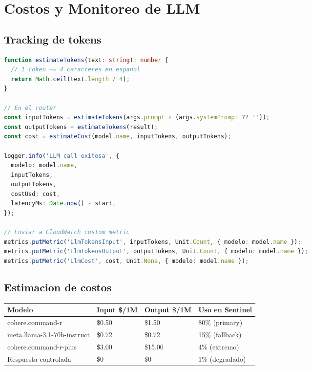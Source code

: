 \documentclass[11pt,a4paper]{article}
\begin{document}
\section{Costos y Monitoreo de LLM}

\subsection{Tracking de tokens}

\begin{lstlisting}[language=TypeScript, caption={Estimar tokens consumidos}]
function estimateTokens(text: string): number {
  // 1 token ~= 4 caracteres en espanol
  return Math.ceil(text.length / 4);
}

// En el router
const inputTokens = estimateTokens(args.prompt + (args.systemPrompt ?? ''));
const outputTokens = estimateTokens(result);
const cost = estimateCost(model.name, inputTokens, outputTokens);

logger.info('LLM call exitosa', {
  modelo: model.name,
  inputTokens,
  outputTokens,
  costUsd: cost,
  latencyMs: Date.now() - start,
});

// Enviar a CloudWatch custom metric
metrics.putMetric('LlmTokensInput', inputTokens, Unit.Count, { modelo: model.name });
metrics.putMetric('LlmTokensOutput', outputTokens, Unit.Count, { modelo: model.name });
metrics.putMetric('LlmCost', cost, Unit.None, { modelo: model.name });
\end{lstlisting}

\subsection{Estimacion de costos}

\begin{longtable}{|p{5cm}|p{3cm}|p{3cm}|p{3cm}|}
\hline
\rowcolor{primary!20}
\textbf{Modelo} & \textbf{Input \$/1M} & \textbf{Output \$/1M} & \textbf{Uso en Sentinel} \\
\hline
\endhead
cohere.command-r & \$0.50 & \$1.50 & 80\% (primary) \\
\hline
meta.llama-3.1-70b-instruct & \$0.72 & \$0.72 & 15\% (fallback) \\
\hline
cohere.command-r-plus & \$3.00 & \$15.00 & 4\% (extremo) \\
\hline
Respuesta controlada & \$0 & \$0 & 1\% (degradado) \\
\hline
\end{longtable}
\end{document}
